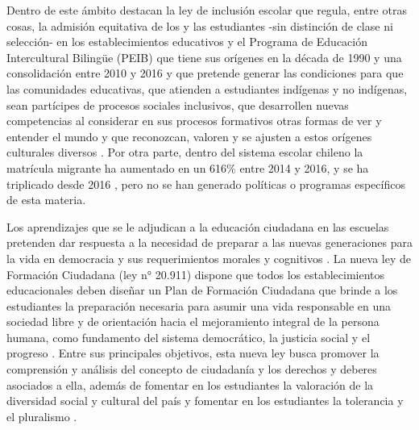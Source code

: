 \documentclass[12pt,twoside]{templates/facsothesis}
\begin{document}
Dentro de este ámbito destacan la ley de inclusión escolar que regula, entre otras cosas, la admisión equitativa de los y las estudiantes -sin distinción de clase ni selección- en los establecimientos educativos \citep{bibliotecadelcongresonacional_ley_2015} y el Programa de Educación Intercultural Bilingüe (PEIB) que tiene sus orígenes en la década de 1990 y una consolidación entre 2010 y 2016 y que pretende generar las condiciones para que las comunidades educativas, que atienden a estudiantes indígenas y no indígenas, sean partícipes de procesos sociales inclusivos, que desarrollen nuevas competencias al considerar en sus procesos formativos otras formas de ver y entender el mundo y que reconozcan, valoren y se ajusten a estos orígenes culturales diversos \citep{ministeriodeeducacion_Programa_2017}. Por otra parte, dentro del sistema escolar chileno la matrícula migrante ha aumentado en un 616\% entre 2014 y 2016, y se ha triplicado desde 2016 \citep{roessler_acceso_2020}, pero no se han generado políticas o programas específicos de esta materia.

Los aprendizajes que se le adjudican a la educación ciudadana en las escuelas pretenden dar respuesta a la necesidad de preparar a las nuevas generaciones para la vida en democracia y sus requerimientos morales y cognitivos \citep{cox_objetivos_2015}. La nueva ley de Formación Ciudadana (ley n° 20.911) dispone que todos los establecimientos educacionales deben diseñar un Plan de Formación Ciudadana que brinde a los estudiantes la preparación necesaria para asumir una vida responsable en una sociedad libre y de orientación hacia el mejoramiento integral de la persona humana, como fundamento del sistema democrático, la justicia social y el progreso \citep{bibliotecadelcongresonacional_plan_2016}. Entre sus principales objetivos, esta nueva ley busca promover la comprensión y análisis del concepto de ciudadanía y los derechos y deberes asociados a ella, además de fomentar en los estudiantes la valoración de la diversidad social y cultural del país y fomentar en los estudiantes la tolerancia y el pluralismo \citep{bibliotecadelcongresonacional_plan_2016}.
\end{document}
